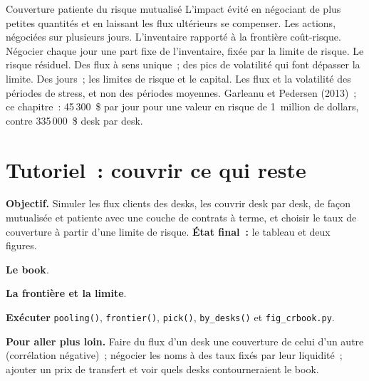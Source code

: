 \begin{strategyfile}{Couverture patiente du risque mutualisé}\label{strat:s2:the-central-risk-book:patient}
 L'impact évité en négociant de plus petites quantités et en laissant les flux ultérieurs se compenser.
 Les actions, négociées sur plusieurs jours.
 L'inventaire rapporté à la frontière coût-risque.
 Négocier chaque jour une part fixe de l'inventaire, fixée par la limite de risque.
 Le risque résiduel.
 Des flux à sens unique~; des pics de volatilité qui font dépasser la limite.
 Des jours~; les limites de risque et le capital.
 Les flux et la volatilité des périodes de stress, et non des périodes moyennes.
 Garleanu et Pedersen (2013)~; ce chapitre~: 45\,300~\$ par jour pour une valeur en risque de 1~million de dollars, contre 335\,000~\$ desk par desk.
\end{strategyfile}

\section{Tutoriel~: couvrir ce qui reste}\label{tut:s2:the-central-risk-book:tut}

\begin{tutorial}
\textbf{Objectif.} Simuler les flux clients des desks, les couvrir desk par desk, de façon mutualisée et patiente avec une couche de contrats à terme, et choisir le taux de couverture à partir d'une
limite de risque. \textbf{État final~:} le tableau et deux figures.
\begin{tutsteps}
\item \textbf{Le book}.
\label{lst:s2:the-central-risk-book:book}
\item \textbf{La frontière et la limite}.
\label{lst:s2:the-central-risk-book:frontier}
\item \textbf{Exécuter} \texttt{pooling()}, \texttt{frontier()}, \texttt{pick()}, \texttt{by\_desks()} et \texttt{fig\_crbook.py}.
\end{tutsteps}
\textbf{Pour aller plus loin.} Faire du flux d'un desk une couverture de celui d'un autre (corrélation négative)~; négocier les noms à des taux fixés par leur liquidité~;
ajouter un prix de transfert et voir quels desks contourneraient le book.
\end{tutorial}

